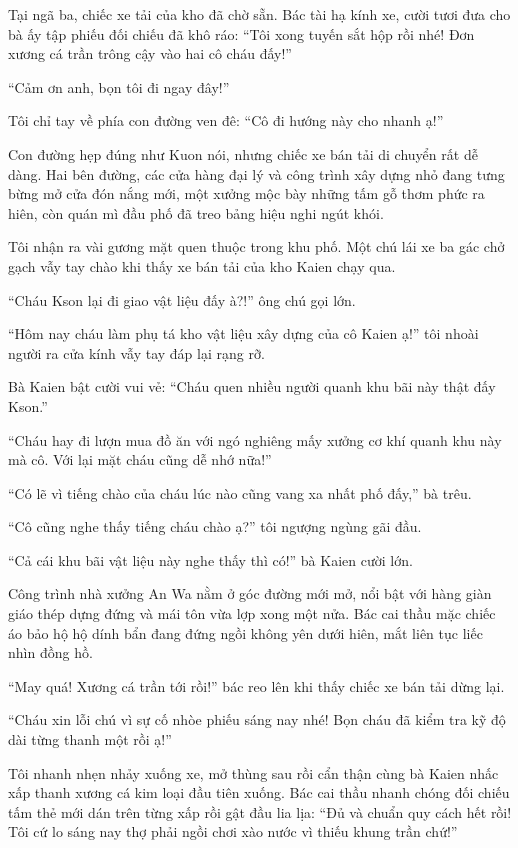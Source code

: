 ﻿\documentclass[../main.tex]{subfiles}
\begin{document}
Tại ngã ba, chiếc xe tải của kho đã chờ sẵn. Bác tài hạ kính xe, cười tươi đưa cho bà ấy tập phiếu đối chiếu đã khô ráo: ``Tôi xong tuyến sắt hộp rồi nhé! Đơn xương cá trần trông cậy vào hai cô cháu đấy!''

``Cảm ơn anh, bọn tôi đi ngay đây!''

Tôi chỉ tay về phía con đường ven đê: ``Cô đi hướng này cho nhanh ạ!''

Con đường hẹp đúng như Kuon nói, nhưng chiếc xe bán tải di chuyển rất dễ dàng. Hai bên đường, các cửa hàng đại lý và công trình xây dựng nhỏ đang tưng bừng mở cửa đón nắng mới, một xưởng mộc bày những tấm gỗ thơm phức ra hiên, còn quán mì đầu phố đã treo bảng hiệu nghi ngút khói.

Tôi nhận ra vài gương mặt quen thuộc trong khu phố. Một chú lái xe ba gác chở gạch vẫy tay chào khi thấy xe bán tải của kho Kaien chạy qua.

``Cháu Kson lại đi giao vật liệu đấy à?!'' ông chú gọi lớn.

``Hôm nay cháu làm phụ tá kho vật liệu xây dựng của cô Kaien ạ!'' tôi nhoài người ra cửa kính vẫy tay đáp lại rạng rỡ.

Bà Kaien bật cười vui vẻ: ``Cháu quen nhiều người quanh khu bãi này thật đấy Kson.''

``Cháu hay đi lượn mua đồ ăn với ngó nghiêng mấy xưởng cơ khí quanh khu này mà cô. Với lại mặt cháu cũng dễ nhớ nữa!''

``Có lẽ vì tiếng chào của cháu lúc nào cũng vang xa nhất phố đấy,'' bà trêu.

``Cô cũng nghe thấy tiếng cháu chào ạ?'' tôi ngượng ngùng gãi đầu.

``Cả cái khu bãi vật liệu này nghe thấy thì có!'' bà Kaien cười lớn.

\ct

Công trình nhà xưởng An Wa nằm ở góc đường mới mở, nổi bật với hàng giàn giáo thép dựng đứng và mái tôn vừa lợp xong một nửa. Bác cai thầu mặc chiếc áo bảo hộ hộ dính bẩn đang đứng ngồi không yên dưới hiên, mắt liên tục liếc nhìn đồng hồ.

``May quá! Xương cá trần tới rồi!'' bác reo lên khi thấy chiếc xe bán tải dừng lại.

``Cháu xin lỗi chú vì sự cố nhòe phiếu sáng nay nhé! Bọn cháu đã kiểm tra kỹ độ dài từng thanh một rồi ạ!''

Tôi nhanh nhẹn nhảy xuống xe, mở thùng sau rồi cẩn thận cùng bà Kaien nhấc xấp thanh xương cá kim loại đầu tiên xuống. Bác cai thầu nhanh chóng đối chiếu tấm thẻ mới dán trên từng xấp rồi gật đầu lia lịa: ``Đủ và chuẩn quy cách hết rồi! Tôi cứ lo sáng nay thợ phải ngồi chơi xào nước vì thiếu khung trần chứ!''
\end{document}
